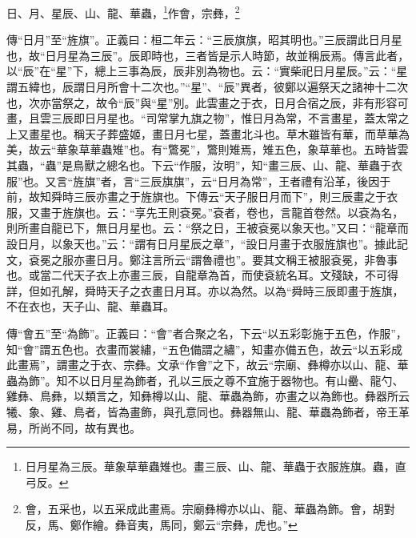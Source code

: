 日、月、星辰、山、龍、華蟲，\footnote{日月星為三辰。華象草華蟲雉也。畫三辰、山、龍、華蟲于衣服旌旗。蟲，直弓反。}作會，宗彝，\footnote{會，五采也，以五采成此畫焉。宗廟彝樽亦以山、龍、華蟲為飾。會，胡對反，馬、鄭作繪。彝音夷，馬同，鄭云“宗彝，虎也。”}


{\noindent\zhuan{}\fzbyks 傳“日月”至“旌旗”。正義曰：桓二年云：“三辰旗旗，昭其明也。”三辰謂此日月星也，故“日月星為三辰”。辰即時也，三者皆是示人時節，故並稱辰焉。傳言此者，以“辰”在“星”下，總上三事為辰，辰非別為物也。云：“實柴祀日月星辰。”云：“星謂五緯也，辰謂日月所會十二次也。”“星”、“辰”異者，彼鄭以遍祭天之諸神十二次也，次亦當祭之，故令“辰”與“星”別。此雲畫之于衣，日月合宿之辰，非有形容可畫，且雲三辰即日月星也。“司常掌九旗之物”，惟日月為常，不言畫星，蓋太常之上又畫星也。稱天子葬盛姬，畫日月七星，蓋畫北斗也。草木雖皆有華，而草華為美，故云“華象草華蟲雉”也。有“鷩冕”，鷩則雉焉，雉五色，象草華也。五時皆雲其蟲，“蟲”是鳥獸之總名也。下云“作服，汝明”，知“畫三辰、山、龍、華蟲于衣服”也。又言“旌旗”者，言“三辰旗旗”，云“日月為常”，王者禮有沿革，後因于前，故知舜時三辰亦畫之于旌旗也。下傳云“天子服日月而下”，則三辰畫之于衣服，又畫于旌旗也。云：“享先王則袞冕。”袞者，卷也，言龍首卷然。以袞為名，則所畫自龍已下，無日月星也。云：“祭之日，王被袞冕以象天也。”又曰：“龍章而設日月，以象天也。”云：“謂有日月星辰之章”，“設日月畫于衣服旌旗也”。據此記文，袞冕之服亦畫日月。鄭注言所云“謂魯禮也”。要其文稱王被服袞冕，非魯事也。或當二代天子衣上亦畫三辰，自龍章為首，而使袞統名耳。文殘缺，不可得詳，但如孔解，舜時天子之衣畫日月耳。亦以為然。以為“舜時三辰即畫于旌旗，不在衣也，天子山、龍、華蟲耳。 \par}

{\noindent\zhuan{}\fzbyks 傳“會五”至“為飾”。正義曰：“會”者合聚之名，下云“以五彩彰施于五色，作服”，知“會”謂五色也。衣畫而裳繡，“五色備謂之繡”，知畫亦備五色，故云“以五彩成此畫焉”，謂畫之于衣、宗彝。文承“作會”之下，故云“宗廟、彝樽亦以山、龍、華蟲為飾”。知不以日月星為飾者，孔以三辰之尊不宜施于器物也。有山罍、龍勺、雞彝、鳥彝，以類言之，知彝樽以山、龍、華蟲為飾，亦畫之以為飾也。彝器所云犧、象、雞、鳥者，皆為畫飾，與孔意同也。彝器無山、龍、華蟲為飾者，帝王革易，所尚不同，故有異也。 \par}

